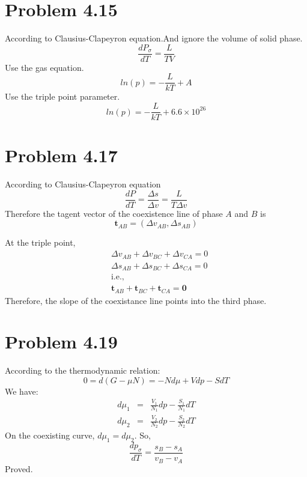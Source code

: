 \documentclass{article}
\begin{document}
\section*{Problem 4.15} %
\label{sec:problem_4_15}
	

	According to Clausius-Clapeyron equation.And ignore the volume of solid phase.
	$$\frac{dP_{\sigma}}{dT}=\frac{L}{TV}$$
	Use the gas equation.
	$$ln(p)=-\frac{L}{kT}+A$$
	Use the triple point parameter.
	$$ln(p)=-\frac{L}{kT}+6.6\times10^{26}$$

\section*{Problem 4.17} %
\label{sec:problem_4_17}
	According to Clausius-Clapeyron equation
	\begin{equation}
		\frac{dP}{dT}=\frac{\Delta s}{\Delta v} = \frac{L}{T \Delta v}
	\end{equation}
	Therefore the tagent vector of the coexistence line of phase $A$ and $B$ is
	\begin{equation}
		\bm t_{AB} = ( \Delta v_{AB} , \Delta s_{AB} )
	\end{equation}

	At the triple point,
	\begin{align*}
		&\Delta v_{AB}+\Delta v_{BC}+\Delta v_{CA}=0\\
		&\Delta s_{AB}+\Delta s_{BC}+\Delta s_{CA}=0\\
		&\text{i.e.,}\\
		&\bm t_{AB}+\bm t_{BC}+\bm t_{CA}=\bm 0
	\end{align*}
	Therefore, the slope of the coexistance line points into the third phase.


\section*{Problem 4.19}
According to the thermodynamic relation:
$$
0=d(G-\mu N)=-Nd\mu +Vdp-SdT  
$$
We have:
\begin{eqnarray*}
d\mu_1 &=& \frac{V_1}{N_1}dp-\frac{S_1}{N_1}dT  \\
d\mu_2 &=& \frac{V_2}{N_2}dp-\frac{S_2}{N_2}dT 
\end{eqnarray*}
On the coexisting curve, $d\mu_1=d\mu_2$. So,
$$\frac{dp_{\sigma}}{dT}=\frac{s_B-s_A}{v_B-v_A}$$
Proved.
\end{document}

